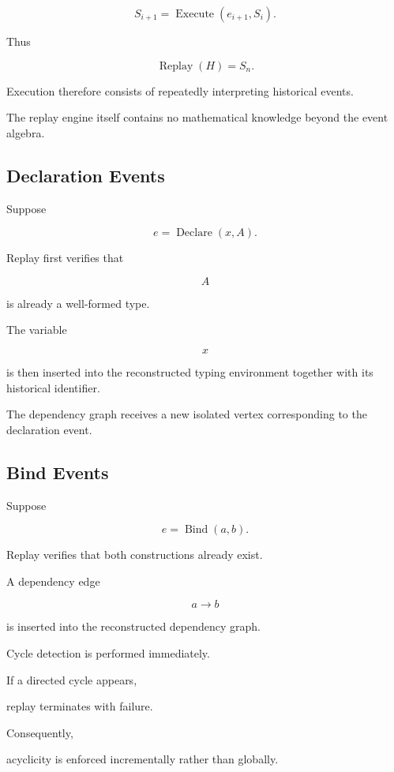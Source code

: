 \documentclass[12pt,oneside]{article}
\theoremstyle{definition}
\theoremstyle{remark}
\DeclareMathOperator{\Replay}{Replay}
\begin{document}
\[
S_{i+1}
=
\operatorname{Execute}
(
e_{i+1},
S_i
).
\]

Thus

\[
\Replay(H)
=
S_n.
\]

Execution therefore consists of repeatedly interpreting historical events.

The replay engine itself contains no mathematical knowledge beyond the event
algebra.


\subsection{Declaration Events}

Suppose

\[
e
=
\operatorname{Declare}(x,A).
\]

Replay first verifies that

\[
A
\]

is already a well-formed type.

The variable

\[
x
\]

is then inserted into the reconstructed typing environment together with its
historical identifier.

The dependency graph receives a new isolated vertex corresponding to the
declaration event.


\subsection{Bind Events}

Suppose

\[
e
=
\operatorname{Bind}(a,b).
\]

Replay verifies that both constructions already exist.

A dependency edge

\[
a
\rightarrow
b
\]

is inserted into the reconstructed dependency graph.

Cycle detection is performed immediately.

If a directed cycle appears,

replay terminates with failure.

Consequently,

acyclicity is enforced incrementally rather than globally.
\end{document}
